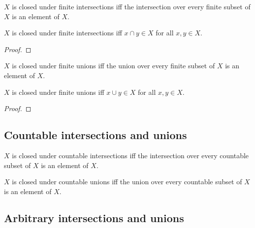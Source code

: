 \documentclass[../../basic-notions.ftl.tex]{subfiles}
\begin{document}
  \begin{forthel}
    \begin{definition}
      $X$ is closed under finite intersections iff the intersection over every finite subset of $X$ is an element of $X$.
    \end{definition}

    \begin{proposition}
      $X$ is closed under finite intersections iff $x \cap y \in X$ for all $x,y \in X$.
    \end{proposition}
    \begin{proof}
    \end{proof}

    \begin{definition}
      $X$ is closed under finite unions iff the union over every finite subset of $X$ is an element of $X$.
    \end{definition}

    \begin{proposition}
      $X$ is closed under finite unions iff $x \cup y \in X$ for all $x,y \in X$.
    \end{proposition}
    \begin{proof}
    \end{proof}
  \end{forthel}


  \subsection{Countable intersections and unions}

  \begin{forthel}
    \begin{definition}
      $X$ is closed under countable intersections iff the intersection over every countable subset of $X$ is an element of $X$.
    \end{definition}

    \begin{definition}
      $X$ is closed under countable unions iff the union over every countable subset of $X$ is an element of $X$.
    \end{definition}
  \end{forthel}


  \subsection{Arbitrary intersections and unions}
\end{document}
